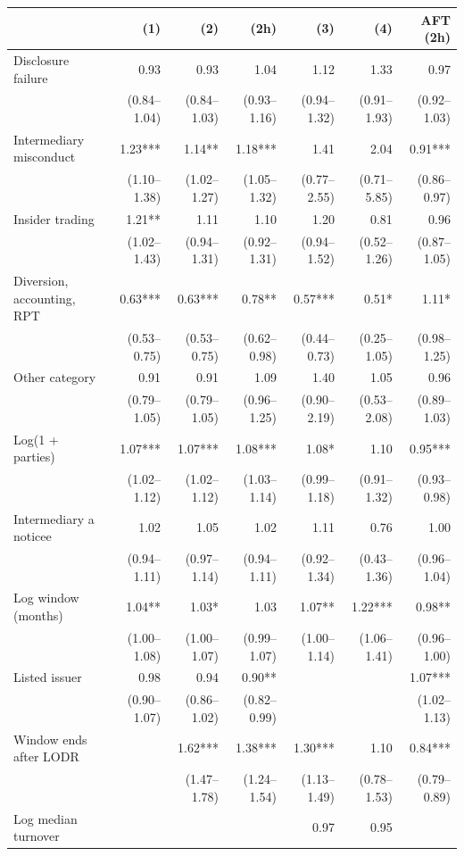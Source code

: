 \begin{tabular*}{\textwidth}[]{l@{\extracolsep\fill}rrrrrr}
\toprule
 & (1) & (2) & (2h) & (3) & (4) & AFT (2h)\\
\midrule
Disclosure failure & 0.93 & 0.93 & 1.04 & 1.12 & 1.33 & 0.97\\
 & (0.84--1.04) & (0.84--1.03) & (0.93--1.16) & (0.94--1.32) & (0.91--1.93) & (0.92--1.03)\\
Intermediary misconduct & 1.23*** & 1.14** & 1.18*** & 1.41 & 2.04 & 0.91***\\
 & (1.10--1.38) & (1.02--1.27) & (1.05--1.32) & (0.77--2.55) & (0.71--5.85) & (0.86--0.97)\\
Insider trading & 1.21** & 1.11 & 1.10 & 1.20 & 0.81 & 0.96\\
 & (1.02--1.43) & (0.94--1.31) & (0.92--1.31) & (0.94--1.52) & (0.52--1.26) & (0.87--1.05)\\
Diversion, accounting, RPT & 0.63*** & 0.63*** & 0.78** & 0.57*** & 0.51* & 1.11*\\
 & (0.53--0.75) & (0.53--0.75) & (0.62--0.98) & (0.44--0.73) & (0.25--1.05) & (0.98--1.25)\\
Other category & 0.91 & 0.91 & 1.09 & 1.40 & 1.05 & 0.96\\
 & (0.79--1.05) & (0.79--1.05) & (0.96--1.25) & (0.90--2.19) & (0.53--2.08) & (0.89--1.03)\\
Log(1 + parties) & 1.07*** & 1.07*** & 1.08*** & 1.08* & 1.10 & 0.95***\\
 & (1.02--1.12) & (1.02--1.12) & (1.03--1.14) & (0.99--1.18) & (0.91--1.32) & (0.93--0.98)\\
Intermediary a noticee & 1.02 & 1.05 & 1.02 & 1.11 & 0.76 & 1.00\\
 & (0.94--1.11) & (0.97--1.14) & (0.94--1.11) & (0.92--1.34) & (0.43--1.36) & (0.96--1.04)\\
Log window (months) & 1.04** & 1.03* & 1.03 & 1.07** & 1.22*** & 0.98**\\
 & (1.00--1.08) & (1.00--1.07) & (0.99--1.07) & (1.00--1.14) & (1.06--1.41) & (0.96--1.00)\\
Listed issuer & 0.98 & 0.94 & 0.90** &  &  & 1.07***\\
 & (0.90--1.07) & (0.86--1.02) & (0.82--0.99) &  &  & (1.02--1.13)\\
Window ends after LODR &  & 1.62*** & 1.38*** & 1.30*** & 1.10 & 0.84***\\
 &  & (1.47--1.78) & (1.24--1.54) & (1.13--1.49) & (0.78--1.53) & (0.79--0.89)\\
Log median turnover &  &  &  & 0.97 & 0.95 & \\

\end{tabular*}

